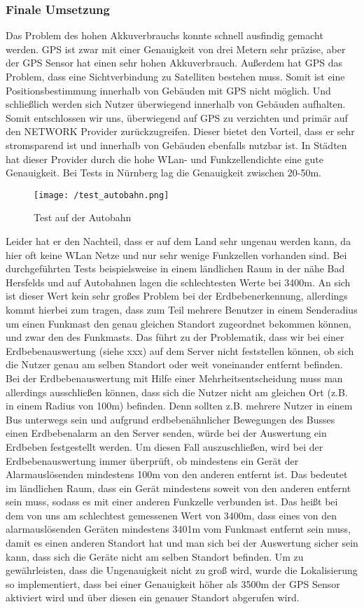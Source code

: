 \subsubsection{Finale Umsetzung}
Das Problem des hohen Akkuverbrauchs konnte schnell ausfindig gemacht werden. GPS ist zwar mit einer Genauigkeit von drei Metern sehr präzise, aber der GPS Sensor hat einen sehr hohen Akkuverbrauch. Außerdem hat GPS das Problem, dass eine Sichtverbindung zu Satelliten bestehen muss. Somit ist eine Positionsbestimmung innerhalb von Gebäuden mit GPS nicht möglich. Und schließlich werden sich Nutzer überwiegend innerhalb von Gebäuden aufhalten.
Somit entschlossen wir uns, überwiegend auf GPS zu verzichten und primär auf den NETWORK Provider zurückzugreifen. Dieser bietet den Vorteil, dass er sehr stromsparend ist und innerhalb von Gebäuden ebenfalls nutzbar ist. In Städten hat dieser Provider durch die hohe WLan- und Funkzellendichte eine gute Genauigkeit. Bei Tests in Nürnberg lag die Genauigkeit zwischen 20-50m.
\begin{wrapfigure}{r}{60mm}
\centering
   \texttt{[image: /test\_autobahn.png]} 
   \caption[Lokalisierung: Test auf der Autobahn]{Test auf der Autobahn}
\end{wrapfigure}
Leider hat er den Nachteil, dass er auf dem Land sehr ungenau werden kann, da hier oft keine WLan Netze und nur sehr wenige Funkzellen vorhanden sind. Bei durchgeführten Tests beispielsweise in einem ländlichen Raum in der nähe Bad Hersfelds und auf Autobahnen lagen die schlechtesten Werte bei 3400m. An sich ist dieser Wert kein sehr großes Problem bei der Erdbebenerkennung, allerdings kommt hierbei zum tragen, dass zum Teil mehrere Benutzer in einem Senderadius um einen Funkmast den genau gleichen Standort zugeordnet bekommen können, und zwar den des Funkmasts. Das führt zu der Problematik, dass wir bei einer Erdbebenauswertung (siehe xxx) auf dem Server nicht feststellen können, ob sich die Nutzer genau am selben Standort oder weit voneinander entfernt befinden. Bei der Erdbebenauswertung mit Hilfe einer Mehrheitsentscheidung muss man allerdings ausschließen können, dass sich die Nutzer nicht am gleichen Ort (z.B. in einem Radius von 100m) befinden. Denn sollten z.B. mehrere Nutzer in einem Bus unterwegs sein und aufgrund erdbebenähnlicher Bewegungen des Busses einen Erdbebenalarm an den Server senden, würde bei der Auswertung ein Erdbeben festgestellt werden. Um diesen Fall auszuschließen, wird bei der Erdbebenauswertung immer überprüft, ob mindestens ein Gerät der Alarmauslösenden mindestens 100m von den anderen entfernt ist. Das bedeutet im ländlichen Raum, dass ein Gerät mindestens soweit von den anderen entfernt sein muss, sodass es mit einer anderen Funkzelle verbunden ist. Das heißt bei dem von uns am schlechtest gemessenen Wert von 3400m, dass eines von den alarmauslösenden Geräten mindestens 3401m vom Funkmast entfernt sein muss, damit es einen anderen Standort hat und man sich bei der Auswertung sicher sein kann, dass sich die Geräte nicht am selben Standort befinden. Um zu gewährleisten, dass die Ungenauigkeit nicht zu groß wird, wurde die Lokalisierung so implementiert, dass bei einer Genauigkeit höher als 3500m der GPS Sensor aktiviert wird und über diesen ein genauer Standort abgerufen wird.
